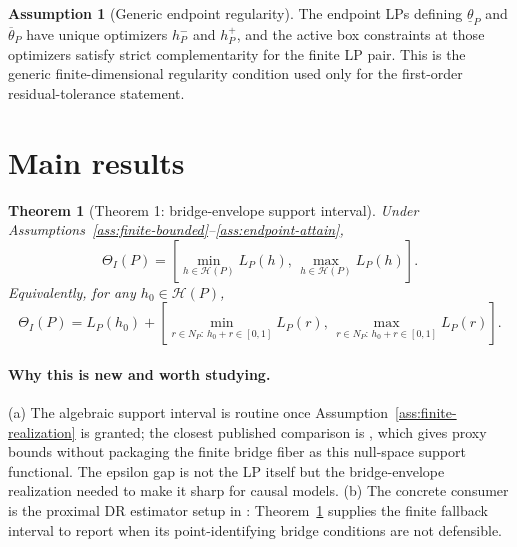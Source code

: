 \documentclass[11pt]{article}
\newcommand{\calH}{\mathcal{H}}
\theoremstyle{definition}
\newtheorem{assumption}{Assumption}
\theoremstyle{plain}
\newtheorem{theorem}{Theorem}
\theoremstyle{remark}
\begin{document}
\begin{assumption}[Generic endpoint regularity]\label{ass:generic-endpoint}
The endpoint LPs defining \(\underline\theta_P\) and \(\overline\theta_P\)
have unique optimizers \(h_P^-\) and \(h_P^+\), and the active box constraints
at those optimizers satisfy strict complementarity for the finite LP pair.
This is the generic finite-dimensional regularity condition used only for
the first-order residual-tolerance statement.
\end{assumption}

\section{Main results}
\begin{theorem}[Theorem 1: bridge-envelope support interval]\label{thm:support-interval}
Under Assumptions~\ref{ass:finite-bounded}--\ref{ass:endpoint-attain},
\[
\Theta_I(P)=
\left[
\min_{h\in\calH(P)} L_P(h),\,
\max_{h\in\calH(P)} L_P(h)
\right].
\]
Equivalently, for any \(h_0\in\calH(P)\),
\[
\Theta_I(P)=L_P(h_0)+
\left[
\min_{r\in N_P:\,h_0+r\in[0,1]}L_P(r),\,
\max_{r\in N_P:\,h_0+r\in[0,1]}L_P(r)
\right].
\]
\end{theorem}
\paragraph{Why this is new and worth studying.}
(a) The algebraic support interval is routine once
Assumption~\ref{ass:finite-realization} is granted; the closest published
comparison is \citet{GhassamiShpitserTchetgen2023ProxyPI}, which gives proxy
bounds without packaging the finite bridge fiber as this null-space support
functional.  The epsilon gap is not the LP itself but the bridge-envelope
realization needed to make it sharp for causal models.  (b) The concrete
consumer is the proximal DR estimator setup in \citet{CuiPuShiMiaoTchetgen2024JASA}:
Theorem~\ref{thm:support-interval} supplies the finite fallback interval to
report when its point-identifying bridge conditions are not defensible.
\end{document}
